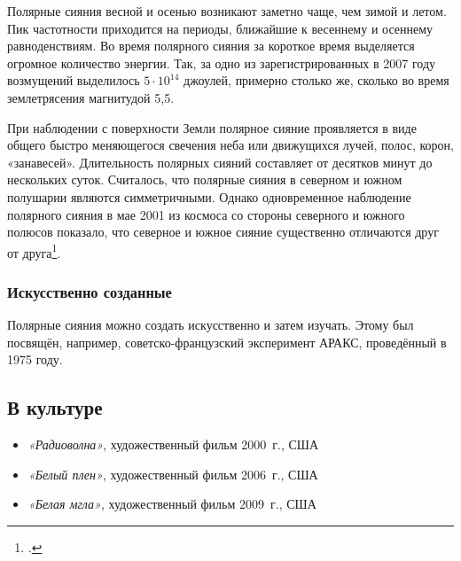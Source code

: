 \documentclass[a4paper,14pt]{article}
\begin{document}
Полярные сияния весной и осенью возникают заметно чаще, чем зимой и летом. Пик частотности приходится на периоды, ближайшие к весеннему и осеннему равноденствиям. Во время полярного сияния за короткое время выделяется огромное количество энергии. Так, за одно из зарегистрированных в 2007 году возмущений выделилось $5\cdot10^{14}$ джоулей, примерно столько же, сколько во время землетрясения магнитудой 5,5.

При наблюдении с поверхности Земли полярное сияние проявляется в виде общего быстро меняющегося свечения неба или движущихся лучей, полос, корон, «занавесей». Длительность полярных сияний составляет от десятков минут до нескольких суток. Считалось, что полярные сияния в северном и южном полушарии являются симметричными. Однако одновременное наблюдение полярного сияния в мае
2001 из космоса со стороны северного и южного полюсов показало, что северное и южное сияние существенно отличаются друг от друга\footcite[20]{KruesiL}.

\subsubsection*{Искусственно созданные}

Полярные сияния можно создать искусственно и затем изучать. Этому был посвящён, например, советско-французский эксперимент АРАКС, проведённый в 1975 году.

\subsection*{В культуре}

\begin{itemize}
	\item[\textcolor{blue}\textbullet] \textit{«Радиоволна»}, художественный фильм 2000~г., США
	\item[\textcolor{blue}\textbullet] \textit{«Белый плен»}, художественный фильм 2006~г., США
	\item[\textcolor{blue}\textbullet] \textit{«Белая мгла»}, художественный фильм 2009~г., США
\end{itemize}

\nocite{*}
\printbibliography[heading=subbibintoc,title={Литература},notcategory=fullcited]
\end{document}
